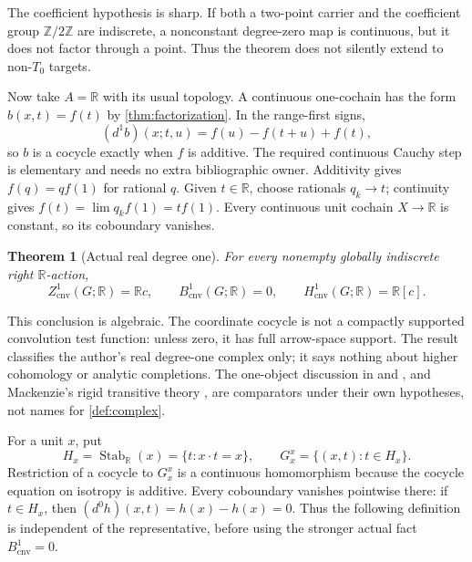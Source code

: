 \documentclass[11pt]{article}
\newtheorem{theorem}{Theorem}[section]
\theoremstyle{definition}
\newcommand{\R}{\mathbb R}
\newcommand{\Z}{\mathbb Z}
\newcommand{\Zcnv}{Z_{\mathrm{cnv}}}
\newcommand{\Bcnv}{B_{\mathrm{cnv}}}
\newcommand{\Hcnv}{H_{\mathrm{cnv}}}
\newcommand{\Stab}{\operatorname{Stab}}
\begin{document}
The coefficient hypothesis is sharp.  If both a two-point carrier and the
coefficient group $\Z/2\Z$ are indiscrete, a nonconstant degree-zero map is
continuous, but it does not factor through a point.  Thus the theorem does
not silently extend to non-$T_0$ targets.

Now take $A=\R$ with its usual topology.  A continuous one-cochain has the
form $b(x,t)=f(t)$ by \cref{thm:factorization}.  In the range-first signs,
\begin{equation}
\label{eq:cauchy-cocycle}
 (d^1b)(x;t,u)=f(u)-f(t+u)+f(t),
\end{equation}
so $b$ is a cocycle exactly when $f$ is additive.  The required continuous
Cauchy step is elementary and needs no extra bibliographic owner.  Additivity
gives $f(q)=qf(1)$ for rational $q$.  Given $t\in\R$, choose rationals
$q_k\to t$; continuity gives $f(t)=\lim q_kf(1)=tf(1)$.  Every continuous
unit cochain $X\to\R$ is constant, so its coboundary vanishes.

\begin{theorem}[Actual real degree one]
\label{thm:actual-h1}
For every nonempty globally indiscrete right $\R$-action,
\begin{equation}
\label{eq:actual-h1}
 \Zcnv^1(G;\R)=\R c,\qquad
 \Bcnv^1(G;\R)=0,
 \qquad \Hcnv^1(G;\R)=\R[c].
\end{equation}
\end{theorem}

This conclusion is algebraic.  The coordinate cocycle is not a compactly
supported convolution test function: unless zero, it has full arrow-space
support.  The result classifies the author's real degree-one complex only;
it says nothing about higher cohomology or analytic completions.  The
one-object discussion in \citet{BlancoUribeWaldorf2023} and
\citet{FuchssteinerWockel2012}, and Mackenzie's rigid transitive theory
\cite{Mackenzie1978}, are comparators under their own hypotheses, not names
for \cref{def:complex}.

For a unit $x$, put
\begin{equation}
\label{eq:isotropy}
 H_x=\Stab_{\R}(x)=\{t:x\mathbin{\cdot}t=x\},
 \qquad G_x^x=\{(x,t):t\in H_x\}.
\end{equation}
Restriction of a cocycle to $G_x^x$ is a continuous homomorphism because
the cocycle equation on isotropy is additive.  Every coboundary vanishes
pointwise there: if $t\in H_x$, then
$(d^0h)(x,t)=h(x)-h(x)=0$.  Thus the following definition is independent of
the representative, before using the stronger actual fact
$\Bcnv^1=0$.
\end{document}
